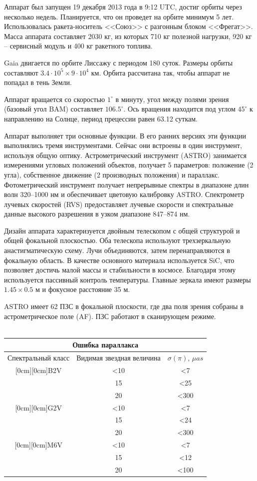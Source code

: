 \documentclass[14pt]{article} %
\begin{document}
Аппарат был запущен 19 декабря 2013 года в 9:12 UTC, достиг орбиты через несколько недель. Планируется, что он проведет на орбите минимум 5 лет. Использовалась ракета-носитель <<Союз>> с разгонным блоком <<Фрегат>>. Масса аппарата составляет 2030 кг, из которых 710 кг полезной нагрузки, 920 кг -- сервисный модуль и 400 кг ракетного топлива.

Gaia двигается по орбите Лиссажу с периодом 180 суток. Размеры орбиты составляют $3.4\cdot10^5 \times 9\cdot10^4$ км. Орбита рассчитана так, чтобы аппарат не попадал в тень Земли.

Аппарат вращается со скоростью $1^\circ$ в минуту, угол между полями зрения (базовый угол BAM) составляет $106.5^\circ$. Ось вращения находится под углом $45^\circ$ к направлению на Солнце, период прецессии равен 63.12 суткам.

Аппарат выполняет три основные функции. В его ранних версиях эти функции выполнялись тремя инструментами. Сейчас они встроены в один инструмент, используя общую оптику. Астрометрический инструмент (ASTRO) занимается измерениями угловых положений объектов, получает 5 параметров: положение (2 угла), собственное движение (2 производных положения) и параллакс. Фотометрический инструмент получает непрерывные спектры в диапазоне длин волн 320--1000 нм и обеспечивает цветовую калибровку ASTRO. Спектрометр лучевых скоростей (RVS) предоставляет лучевые скорости и спектральные данные высокого разрешения в узком диапазоне 847--874 нм.

Дизайн аппарата характеризуется двойным телескопом с общей структурой и общей фокальной плоскостью. Оба телескопа используют трехзеркальную анастигматическую схему. Лучи объединяются, затем перенаправляются в фокальную область. В качестве основного материала используется SiC, что позволяет достичь малой массы и стабильности в космосе. Благодаря этому используется пассивный контроль температуры. Главные зеркала имеют размеры $1.45\times0.5$ м и фокусное расстояние 35 м.

ASTRO имеет 62 ПЗС в фокальной плоскости, где два поля зрения собраны в астрометрическое поле (AF). ПЗС работают в сканирующем режиме.\\\\
\begin{tabular}{|c|c|c|}
\hline
\multicolumn{3}{|c|}{Ошибка параллакса}\\
\hline
Спектральный класс & Видимая звездная величина & $\sigma(\pi)$, $\mu as$\\
\hline
\raisebox{-4ex}[0cm][0cm]{B2V} &<10 &<7\\
\cline{2-3}
& 15 & <25\\
\cline{2-3}
& 20 & <300\\
\hline
\raisebox{-4ex}[0cm][0cm]{G2V} &<10 &<7\\
\cline{2-3}
& 15 & <24\\
\cline{2-3}
&20 & <300\\
\hline
\raisebox{-4ex}[0cm][0cm]{M6V} &<10 &<7\\
\cline{2-3}
& 15 & <12\\
\cline{2-3}
&20 & <100\\
\hline
\end{tabular}\\
\end{document}
